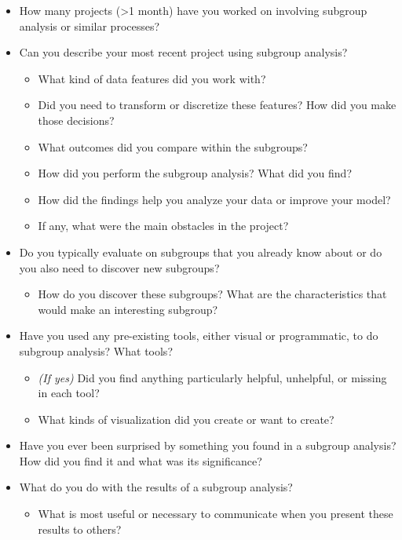 \begin{itemize}
    \item How many projects (\textgreater 1 month) have you worked on involving subgroup analysis or similar processes?
    \item Can you describe your most recent project using subgroup analysis?
    \begin{itemize}
        \item What kind of data features did you work with?
        \item Did you need to transform or discretize these features? How did you make those decisions?
        \item What outcomes did you compare within the subgroups?
        \item How did you perform the subgroup analysis? What did you find?
        \item How did the findings help you analyze your data or improve your model?
        \item If any, what were the main obstacles in the project?
    \end{itemize}
    \item Do you typically evaluate on subgroups that you already know about or do you also need to discover new subgroups?
    \begin{itemize}
        \item How do you discover these subgroups? What are the characteristics that would make an interesting subgroup?
    \end{itemize}
    \item Have you used any pre-existing tools, either visual or programmatic, to do subgroup analysis? What tools?
    \begin{itemize}
        \item \textit{(If yes)} Did you find anything particularly helpful, unhelpful, or missing in each tool?
        \item What kinds of visualization did you create or want to create?
    \end{itemize}
    \item Have you ever been surprised by something you found in a subgroup analysis? How did you find it and what was its significance?
    \item What do you do with the results of a subgroup analysis? 
    \begin{itemize}
        \item What is most useful or necessary to communicate when you present these results to others?
    \end{itemize}
\end{itemize}

